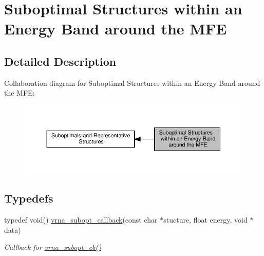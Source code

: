 \hypertarget{group__subopt__wuchty}{}\section{Suboptimal Structures within an Energy Band around the M\+FE}
\label{group__subopt__wuchty}


\subsection{Detailed Description}
Collaboration diagram for Suboptimal Structures within an Energy Band around the M\+FE\+:
\nopagebreak
\begin{figure}[H]
\begin{center}
\leavevmode
\includegraphics[width=350pt]{group__subopt__wuchty}
\end{center}
\end{figure}
\subsection*{Typedefs}
\begin{DoxyCompactItemize}
\item 
typedef void() \hyperlink{group__subopt__wuchty_gaa0270c66d04f59e750401695b8282e04}{vrna\+\_\+subopt\+\_\+callback}(const char $\ast$stucture, float energy, void $\ast$data)
\begin{DoxyCompactList}\small\item\em Callback for \hyperlink{group__subopt__wuchty_ga1053837e6b6f158093508f8a70998352}{vrna\+\_\+subopt\+\_\+cb()} \end{DoxyCompactList}\end{DoxyCompactItemize}
